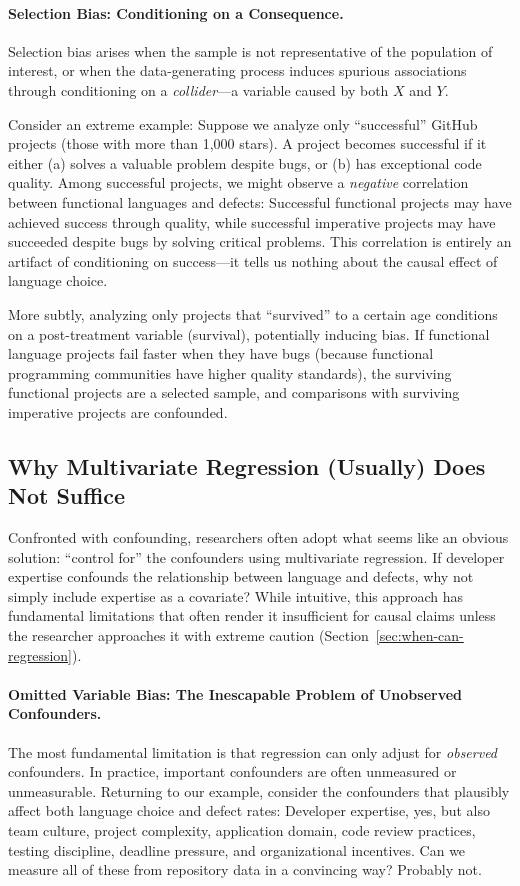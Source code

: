 \paragraph{Selection Bias: Conditioning on a Consequence.}
Selection bias arises when the sample is not representative of the population of interest, or when the data-generating process induces spurious associations through conditioning on a \emph{collider}---a variable caused by both $X$ and $Y$.

Consider an extreme example: Suppose we analyze only ``successful'' GitHub projects (those with more than 1,000 stars).
A project becomes successful if it either (a) solves a valuable problem despite bugs, or (b) has exceptional code quality.
Among successful projects, we might observe a \emph{negative} correlation between functional languages and defects: Successful functional projects may have achieved success through quality, while successful imperative projects may have succeeded despite bugs by solving critical problems.
This correlation is entirely an artifact of conditioning on success---it tells us nothing about the causal effect of language choice.

More subtly, analyzing only projects that ``survived'' to a certain age conditions on a post-treatment variable (survival), potentially inducing bias.
If functional language projects fail faster when they have bugs (because functional programming communities have higher quality standards), the surviving functional projects are a selected sample, and comparisons with surviving imperative projects are confounded.

\subsection{Why Multivariate Regression (Usually) Does Not Suffice}

Confronted with confounding, researchers often adopt what seems like an obvious solution: ``control for'' the confounders using multivariate regression.
If developer expertise confounds the relationship between language and defects, why not simply include expertise as a covariate?
While intuitive, this approach has fundamental limitations that often render it insufficient for causal claims unless the researcher approaches it with extreme caution (Section~\ref{sec:when-can-regression}).

\paragraph{Omitted Variable Bias: The Inescapable Problem of Unobserved Confounders.}
The most fundamental limitation is that regression can only adjust for \emph{observed} confounders.
In practice, important confounders are often unmeasured or unmeasurable.
Returning to our example, consider the confounders that plausibly affect both language choice and defect rates: Developer expertise, yes, but also team culture, project complexity, application domain, code review practices, testing discipline, deadline pressure, and organizational incentives.
Can we measure all of these from repository data in a convincing way?
Probably not.

